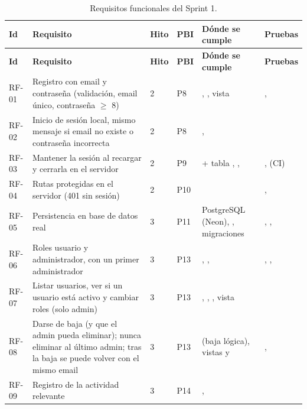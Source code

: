 \begin{longtable}{@{}L{0.7cm} L{2.3cm} L{0.9cm} L{0.6cm} L{6.6cm} L{2.2cm}@{}}
\caption{Requisitos funcionales del Sprint 1.}\label{tab:rf-sprint1}\\
\toprule
\textbf{Id} & \textbf{Requisito} & \textbf{Hito} & \textbf{PBI} & \textbf{Dónde se cumple} & \textbf{Pruebas} \\ \midrule \endfirsthead
\toprule
\textbf{Id} & \textbf{Requisito} & \textbf{Hito} & \textbf{PBI} & \textbf{Dónde se cumple} & \textbf{Pruebas} \\ \midrule \endhead
RF-01 & Registro con email y contraseña (validación, email único, contraseña $\geq$ 8) & 2 & P8 & , , vista  & ,  \\
RF-02 & Inicio de sesión local, mismo mensaje si email no existe o contraseña incorrecta & 2 & P8 & ,  &  \\
RF-03 & Mantener la sesión al recargar y cerrarla en el servidor & 2 & P9 &  + tabla , ,  & ,  (CI) \\
RF-04 & Rutas protegidas en el servidor (401 sin sesión) & 2 & P10 &  & ,  \\
RF-05 & Persistencia en base de datos real & 3 & P11 & PostgreSQL (Neon), , migraciones & , ,  \\
RF-06 & Roles usuario y administrador, con un primer administrador & 3 & P13 & , ,  & , ,  \\
RF-07 & Listar usuarios, ver si un usuario está activo y cambiar roles (solo admin) & 3 & P13 & , , , vista  &  \\
RF-08 & Darse de baja (y que el admin pueda eliminar); nunca eliminar al último admin; tras la baja se puede volver con el mismo email & 3 & P13 &  (baja lógica), vistas  y  & ,  \\
RF-09 & Registro de la actividad relevante & 3 & P14 & ,  &  \\

\end{longtable}
